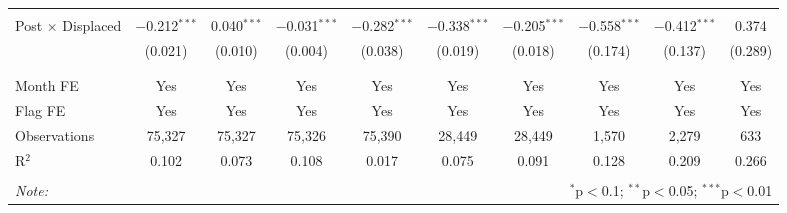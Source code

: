 \begin{table}[H]
\begin{tabular}{@{\extracolsep{1pt}}lccccccccc}
  & & & & & & & & & \\ 
 Post $\times$ Displaced & $-$0.212$^{***}$ & 0.040$^{***}$ & $-$0.031$^{***}$ & $-$0.282$^{***}$ & $-$0.338$^{***}$ & $-$0.205$^{***}$ & $-$0.558$^{***}$ & $-$0.412$^{***}$ & 0.374 \\ 
  & (0.021) & (0.010) & (0.004) & (0.038) & (0.019) & (0.018) & (0.174) & (0.137) & (0.289) \\ 
  & & & & & & & & & \\ 
\hline \\[-1.8ex] 
Month FE & Yes & Yes & Yes & Yes & Yes & Yes & Yes & Yes & Yes \\ 
Flag FE & Yes & Yes & Yes & Yes & Yes & Yes & Yes & Yes & Yes \\ 
Observations & 75,327 & 75,327 & 75,326 & 75,390 & 28,449 & 28,449 & 1,570 & 2,279 & 633 \\ 
R$^{2}$ & 0.102 & 0.073 & 0.108 & 0.017 & 0.075 & 0.091 & 0.128 & 0.209 & 0.266 \\ 
\hline 
\hline \\[-1.8ex] 
\textit{Note:}  & \multicolumn{9}{r}{$^{*}$p$<$0.1; $^{**}$p$<$0.05; $^{***}$p$<$0.01} \\ 
\end{tabular} 
\end{table} 
